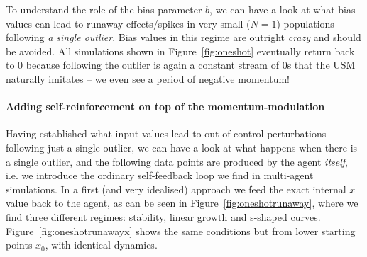To understand the role of the bias parameter $b$, we can have a look at what bias values can lead to runaway effects/spikes in very small ($N=1$) populations following \emph{a single outlier}. Bias values in this regime are outright \emph{crazy} and should be avoided. All simulations shown in Figure~\ref{fig:oneshot} eventually return back to $0$ because following the outlier is again a constant stream of $0$s that the USM naturally imitates -- we even see a period of negative momentum!

\begin{knitrout}
\color{fgcolor}\begin{kframe}


{\ttfamily\noindent\bfseries\color{errorcolor}{\#\# Error in plot.new(): figure margins too large}}\end{kframe}
\end{knitrout}



\paragraph{Adding self-reinforcement on top of the momentum-modulation}

Having established what input values lead to out-of-control perturbations following just a single outlier, we can have a look at what happens when there is a single outlier, and the following data points are produced by the agent \emph{itself}, i.e. we introduce the ordinary self-feedback loop we find in multi-agent simulations. In a first (and very idealised) approach we feed the exact internal $x$ value back to the agent, as can be seen in Figure~\ref{fig:oneshotrunaway}, where we find three different regimes: stability, linear growth and s-shaped curves. Figure~\ref{fig:oneshotrunawayx} shows the same conditions but from lower starting points $x_0$, with identical dynamics.


\begin{knitrout}
\color{fgcolor}\begin{kframe}


{\ttfamily\noindent\bfseries\color{errorcolor}{\#\# Error in plot.new(): figure margins too large}}\end{kframe}
\end{knitrout}

